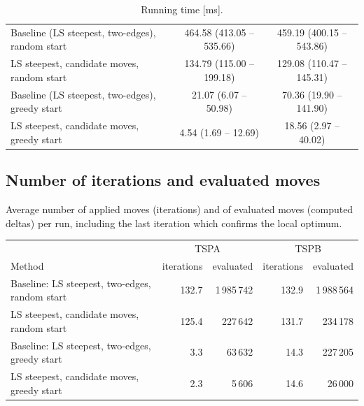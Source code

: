 \documentclass[11pt,a4paper]{article}
\begin{document}
\begin{table}[H]
\begin{tabular}{lcc}
\midrule
Baseline (LS steepest, two-edges), random start & 464.58 (413.05 -- 535.66) & 459.19 (400.15 -- 543.86) \\
LS steepest, candidate moves, random start & 134.79 (115.00 -- 199.18) & 129.08 (110.47 -- 145.31) \\
Baseline (LS steepest, two-edges), greedy start & 21.07 (6.07 -- 50.98) & 70.36 (19.90 -- 141.90) \\
LS steepest, candidate moves, greedy start & 4.54 (1.69 -- 12.69) & 18.56 (2.97 -- 40.02) \\
\bottomrule
\end{tabular}
\caption{Running time [ms].}
\end{table}

\subsection*{Number of iterations and evaluated moves}
Average number of applied moves (iterations) and of evaluated moves (computed deltas) per run,
including the last iteration which confirms the local optimum.
\begin{table}[H]
\centering
\small
\begin{tabular}{lrrrr}
\toprule
 & \multicolumn{2}{c}{TSPA} & \multicolumn{2}{c}{TSPB} \\
Method & iterations & evaluated & iterations & evaluated \\
\midrule
Baseline: LS steepest, two-edges, random start & 132.7 & 1\,985\,742 & 132.9 & 1\,988\,564 \\
LS steepest, candidate moves, random start & 125.4 & 227\,642 & 131.7 & 234\,178 \\
Baseline: LS steepest, two-edges, greedy start & 3.3 & 63\,632 & 14.3 & 227\,205 \\
LS steepest, candidate moves, greedy start & 2.3 & 5\,606 & 14.6 & 26\,000 \\
\bottomrule
\end{tabular}
\end{table}
\end{document}
